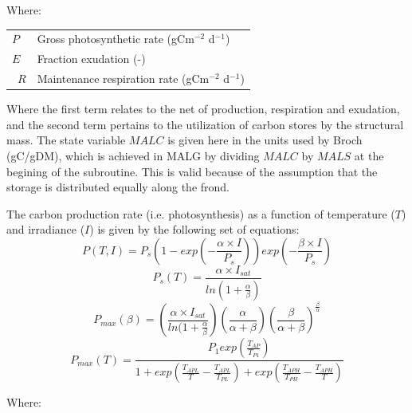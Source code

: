 \documentclass{deltares_manual}
\begin{document}
Where:\\

\begin{tabular}{ll}
$P$ & Gross photosynthetic rate (gCm$^{-2}$ d$^{-1}$)\\
$E$ & Fraction exudation (-)\\\
$R$ & Maintenance respiration rate (gCm$^{-2}$ d$^{-1}$)\\
\end{tabular}

Where the first term relates to the net of production, respiration and exudation, and the second term pertains to the utilization of carbon stores by the structural mass. The state variable $MALC$ is given here in the units used by Broch (gC/gDM), which is achieved in MALG by dividing $MALC$ by $MALS$ at the begining of the subroutine. This is valid because of the assumption that the storage is distributed equally along the frond.

The carbon production rate (i.e. photosynthesis) as a function of temperature ($T$) and irradiance ($I$) is given by the following set of equations:
\begin{equation}
P(T,I) = P_s(1-exp(-\frac{\alpha \times I}{P_s}))exp(-\frac{\beta \times I}{P_s})
\end{equation}
\begin{equation}
P_s(T) = \frac{\alpha \times I_{sat}}{ln(1+\frac{\alpha}{\beta})}
\end{equation}
\begin{equation}
P_{max}(\beta) = (\frac{\alpha \times I_{sat}}{ln(1+\frac{\alpha}{\beta}})(\frac{\alpha}{\alpha+\beta})(\frac{\beta}{\alpha+\beta})^{\frac{\beta}{\alpha}}
\end{equation}
\begin{equation}
P_{max}(T) = \frac{P_1exp(\frac{T_{AP}}{T_{P1}})}{1+exp(\frac{T_{APL}}{T} - \frac{T_{APL}}{T_{PL}})+exp(\frac{T_{APH}}{T_{PH}}-\frac{T_{APH}}{T})}
\end{equation}

Where:\\
\end{document}
